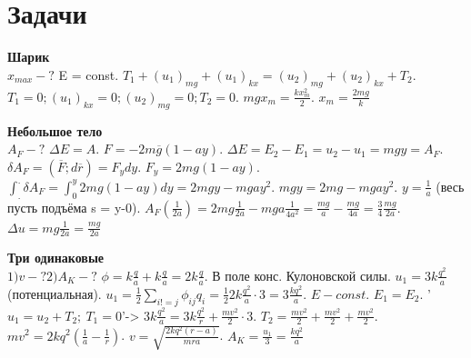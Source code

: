 \documentclass{article}
\begin{document}
\section{Задачи}
\begin{minipage}{.3\textwidth}
\textbf{Шарик}\\
$x_{max}-?$ E = const. $T_1+(u_1)_{mg}+(u_1)_{kx} = (u_2)_{mg}+(u_2)_{kx}+T_2$. $T_1=0; (u_1)_{kx} = 0; (u_2)_{mg} = 0; T_2=0$.
$mgx_m = \frac{kx^2_m}{2}$. $x_m = \frac{2mg}{k}$
\end{minipage}
\hfill
\begin{minipage}{.3\textwidth}
\textbf{Небольшое тело}\\
$A_F-?$ $\Delta E = A$. $F=-2m\overline{g}(1-ay)$. $\Delta E = E_2-E_1 = u_2-u_1=mgy=A_F$.
$\delta A_F = (\overline{F}; d\overline{r}) = F_ydy$. $F_y = 2mg(1-ay)$. $\int_{.}^{.}\delta A_F = \int_{0}^{y}2mg(1-ay)dy = 2mgy - mgay^2$. $mgy = 2mg -mgay^2$. $y=\frac{1}{a}$ (весь пусть подъёма s = y-0). $A_F (\frac{1}{2a}) = 2mg\frac{1}{2a} - mga\frac{1}{4a^2} = \frac{mg}{a} - \frac{mg}{4a} = \frac{3}{4} \frac{mg}{2a}$. $\Delta u =mg\frac{1}{2a}=\frac{mg}{2a}$
\end{minipage}
\hfill
\begin{minipage}{.3\textwidth}
\textbf{Три одинаковые}\\
$1)v-?2)A_K - ?$ $\phi = k\frac{q}{a}+k\frac{q}{a}=2k\frac{q}{a}$. В поле конс. Кулоновской силы. $u_1=3k\frac{q^2}{a}$ (потенциальная). $u_1 = \frac{1}{2}\sum_{i!=j}^{}\phi_{ij}q_i = \frac{1}{2}2k\frac{q^2}{a}\cdot3 = 3\frac{kq^2}{a}$.
$E - const$. $E_1=E_2$. '$u_1=u_2+T_2; \ T_1=0$'-> $3k\frac{q^2}{a}= 3k\frac{q^2}{r}+\frac{mv^2}{2}\cdot 3$. $T_2 = \frac{mv^2}{2}+\frac{mv^2}{2}+\frac{mv^2}{2}$. $mv^2=2kq^2(\frac{1}{a}-\frac{1}{r})$. $v = \sqrt{\frac{2kq^2(r-a)}{mra}}$.
$A_K=\frac{u_1}{3} = \frac{kq^2}{a}$
\end{minipage}
\end{document}

